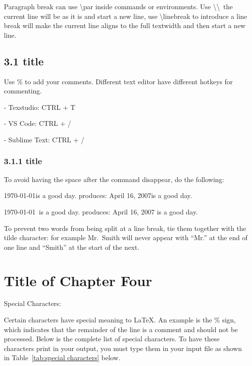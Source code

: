 \documentclass[12pt,openright]{book}
\begin{document}
Paragraph break can use \textbackslash par inside commands or environments. Use \textbackslash \textbackslash\ the current line will be as it is and start a new line, use \textbackslash linebreak to introduce a line break will make the current line aligns to the full textwidth and then start a new line.

\section{3.1 title}

Use \% to add your comments. Different text editor have different hotkeys for commenting.

- Texstudio: CTRL + T

- VS Code: CTRL + /

- Sublime Text: CTRL + /

\subsection{3.1.1 title}

To avoid having the space after the command disappear, do the following:

\today is a good day. produces: April 16, 2007is a good day.

\today\ is a good day. produces: April 16, 2007 is a good day.

To prevent two words from being split at a line break, tie them together with the tilde character: for example Mr.~Smith will never appear with “Mr.” at the end of one line and “Smith” at the start of the next.

\chapter{Title of Chapter Four}

Special Characters:

Certain characters have special meaning to \LaTeX. An example is the \% sign, which indicates that the remainder of the line is a comment and should not be processed. Below is the complete list of special characters. To have these characters print in your output, you must type them in your input file as shown in Table~\ref{tab:special characters} below.
\end{document}
